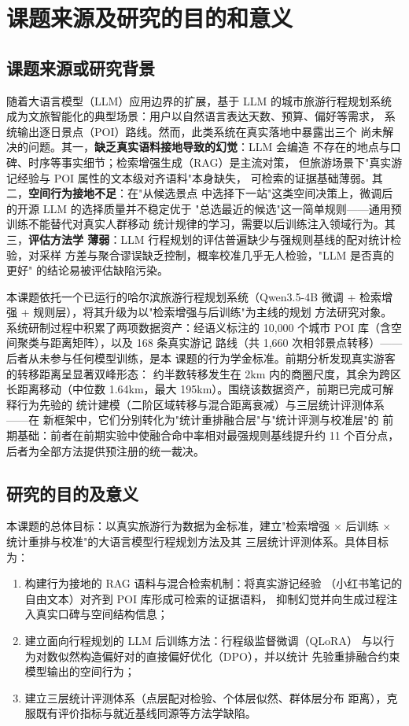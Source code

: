 
\section{课题来源及研究的目的和意义}

\subsection{课题来源或研究背景}

随着大语言模型（LLM）应用边界的扩展，基于 LLM 的城市旅游行程规划系统
成为文旅智能化的典型场景：用户以自然语言表达天数、预算、偏好等需求，
系统输出逐日景点（POI）路线。然而，此类系统在真实落地中暴露出三个
尚未解决的问题。其一，\textbf{缺乏真实语料接地导致的幻觉}：LLM 会编造
不存在的地点与口碑、时序等事实细节；检索增强生成（RAG）是主流对策，
但旅游场景下"真实游记经验与 POI 属性的文本级对齐语料"本身缺失，
可检索的证据基础薄弱。其二，\textbf{空间行为接地不足}：在"从候选景点
中选择下一站"这类空间决策上，微调后的开源 LLM 的选择质量并不稳定优于
"总选最近的候选"这一简单规则——通用预训练不能替代对真实人群移动
统计规律的学习，需要以后训练注入领域行为。其三，\textbf{评估方法学
薄弱}：LLM 行程规划的评估普遍缺少与强规则基线的配对统计检验，对采样
方差与聚合谬误缺乏控制，概率校准几乎无人检验，"LLM 是否真的更好"
的结论易被评估缺陷污染。

本课题依托一个已运行的哈尔滨旅游行程规划系统（Qwen3.5-4B 微调 +
检索增强 + 规则层），将其升级为以"检索增强与后训练"为主线的规划
方法研究对象。系统研制过程中积累了两项数据资产：经语义标注的
10{,}000 个城市 POI 库（含空间聚类与距离矩阵），以及 168 条真实游记
路线（共 1{,}660 次相邻景点转移）——后者从未参与任何模型训练，是本
课题的行为学金标准。前期分析发现真实游客的转移距离呈显著双峰形态：
约半数转移发生在 2km 内的商圈尺度，其余为跨区长距离移动（中位数
1.64km，最大 195km）。围绕该数据资产，前期已完成可解释行为先验的
统计建模（二阶区域转移与混合距离衰减）与三层统计评测体系——在
新框架中，它们分别转化为"统计重排融合层"与"统计评测与校准层"的
前期基础：前者在前期实验中使融合命中率相对最强规则基线提升约
11 个百分点，后者为全部方法提供预注册的统一裁决。

\subsection{研究的目的及意义}

本课题的总体目标：以真实旅游行为数据为金标准，建立"检索增强
$\times$ 后训练 $\times$ 统计重排与校准"的大语言模型行程规划方法及其
三层统计评测体系。具体目标为：
\begin{enumerate}
  \item 构建行为接地的 RAG 语料与混合检索机制：将真实游记经验
        （小红书笔记的自由文本）对齐到 POI 库形成可检索的证据语料，
        抑制幻觉并向生成过程注入真实口碑与空间结构信息；
  \item 建立面向行程规划的 LLM 后训练方法：行程级监督微调（QLoRA）
        与以行为对数似然构造偏好对的直接偏好优化（DPO），并以统计
        先验重排融合约束模型输出的空间行为；
  \item 建立三层统计评测体系（点层配对检验、个体层似然、群体层分布
        距离），克服既有评价指标与就近基线同源等方法学缺陷。
\end{enumerate}

